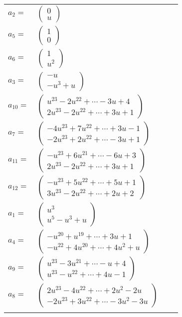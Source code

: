\documentclass[1p]{elsarticle_modified}
\theoremstyle{definition}
\begin{document}
\begin{tabular}{m{7pt} m{180pt} m{7pt} m{180pt} }
\flushright $a_{2}=$&$\begin{pmatrix}0\\u\end{pmatrix}$ \\
\flushright $a_{5}=$&$\begin{pmatrix}1\\0\end{pmatrix}$ \\
\flushright $a_{6}=$&$\begin{pmatrix}1\\u^2\end{pmatrix}$ \\
\flushright $a_{3}=$&$\begin{pmatrix}- u\\- u^3+u\end{pmatrix}$ \\
\flushright $a_{10}=$&$\begin{pmatrix}u^{23}-2 u^{22}+\cdots-3 u+4\\2 u^{23}-2 u^{22}+\cdots+3 u+1\end{pmatrix}$ \\
\flushright $a_{7}=$&$\begin{pmatrix}-4 u^{23}+7 u^{22}+\cdots+3 u-1\\-2 u^{23}+2 u^{22}+\cdots-3 u+1\end{pmatrix}$ \\
\flushright $a_{11}=$&$\begin{pmatrix}- u^{23}+6 u^{21}+\cdots-6 u+3\\2 u^{23}-2 u^{22}+\cdots+3 u+1\end{pmatrix}$ \\
\flushright $a_{12}=$&$\begin{pmatrix}- u^{23}+5 u^{22}+\cdots+5 u+1\\3 u^{23}-2 u^{22}+\cdots+2 u+2\end{pmatrix}$ \\
\flushright $a_{1}=$&$\begin{pmatrix}u^3\\u^5- u^3+u\end{pmatrix}$ \\
\flushright $a_{4}=$&$\begin{pmatrix}- u^{20}+u^{19}+\cdots+3 u+1\\- u^{22}+4 u^{20}+\cdots+4 u^2+u\end{pmatrix}$ \\
\flushright $a_{9}=$&$\begin{pmatrix}u^{23}-3 u^{21}+\cdots- u+4\\u^{23}- u^{22}+\cdots+4 u-1\end{pmatrix}$ \\
\flushright $a_{8}=$&$\begin{pmatrix}2 u^{23}-4 u^{22}+\cdots+2 u^2-2 u\\-2 u^{23}+3 u^{22}+\cdots-3 u^2-3 u\end{pmatrix}$\\&\end{tabular}
\end{document}
